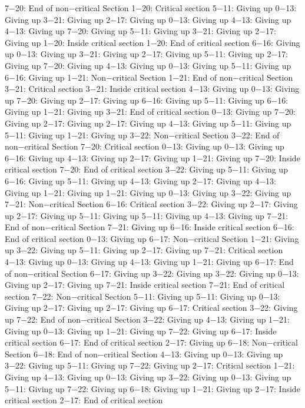 7−20: End of non−critical Section
1−20: Critical section
5−11: Giving up
0−13: Giving up
3−21: Giving up
2−17: Giving up
0−13: Giving up
4−13: Giving up
4−13: Giving up
7−20: Giving up
5−11: Giving up
3−21: Giving up
2−17: Giving up
1−20: Inside critical section
1−20: End of critical section
6−16: Giving up
0−13: Giving up
3−21: Giving up
2−17: Giving up
5−11: Giving up
2−17: Giving up
7−20: Giving up
4−13: Giving up
0−13: Giving up
5−11: Giving up
6−16: Giving up
1−21: Non−critical Section
1−21: End of non−critical Section
3−21: Critical section
3−21: Inside critical section
4−13: Giving up
0−13: Giving up
7−20: Giving up
2−17: Giving up
6−16: Giving up
5−11: Giving up
6−16: Giving up
1−21: Giving up
3−21: End of critical section
0−13: Giving up
7−20: Giving up
2−17: Giving up
2−17: Giving up
4−13: Giving up
5−11: Giving up
5−11: Giving up
1−21: Giving up
3−22: Non−critical Section
3−22: End of non−critical Section
7−20: Critical section
0−13: Giving up
0−13: Giving up
6−16: Giving up
4−13: Giving up
2−17: Giving up
1−21: Giving up
7−20: Inside critical section
7−20: End of critical section
3−22: Giving up
5−11: Giving up
6−16: Giving up
5−11: Giving up
4−13: Giving up
2−17: Giving up
4−13: Giving up
1−21: Giving up
1−21: Giving up
0−13: Giving up
3−22: Giving up
7−21: Non−critical Section
6−16: Critical section
3−22: Giving up
2−17: Giving up
2−17: Giving up
5−11: Giving up
5−11: Giving up
4−13: Giving up
7−21: End of non−critical Section
7−21: Giving up
6−16: Inside critical section
6−16: End of critical section
0−13: Giving up
6−17: Non−critical Section
1−21: Giving up
3−22: Giving up
5−11: Giving up
2−17: Giving up
7−21: Critical section
4−13: Giving up
0−13: Giving up
4−13: Giving up
1−21: Giving up
6−17: End of non−critical Section
6−17: Giving up
3−22: Giving up
3−22: Giving up
0−13: Giving up
2−17: Giving up
7−21: Inside critical section
7−21: End of critical section
7−22: Non−critical Section
5−11: Giving up
5−11: Giving up
0−13: Giving up
2−17: Giving up
2−17: Giving up
6−17: Critical section
3−22: Giving up
7−22: End of non−critical Section
3−22: Giving up
4−13: Giving up
1−21: Giving up
0−13: Giving up
1−21: Giving up
7−22: Giving up
6−17: Inside critical section
6−17: End of critical section
2−17: Giving up
6−18: Non−critical Section
6−18: End of non−critical Section
4−13: Giving up
0−13: Giving up
3−22: Giving up
5−11: Giving up
7−22: Giving up
2−17: Critical section
1−21: Giving up
4−13: Giving up
0−13: Giving up
3−22: Giving up
0−13: Giving up
5−11: Giving up
7−22: Giving up
6−18: Giving up
1−21: Giving up
2−17: Inside critical section
2−17: End of critical section
